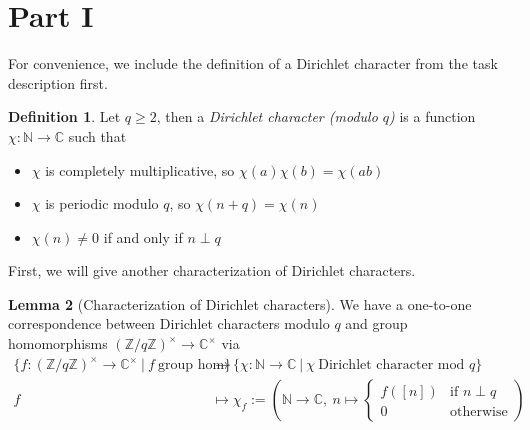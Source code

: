 \documentclass{scrartcl}
\newcommand{\N}{\mathbb{N}}
\newcommand{\Z}{\mathbb{Z}}
\newcommand{\C}{\mathbb{C}}
\newcommand{\units}{\times}
\theoremstyle{definition}
\newtheorem{definition}{Definition}
\newtheorem{lemma}[definition]{Lemma}
\begin{document}
\section{Part I}
For convenience, we include the definition of a Dirichlet character from the task description first.
\begin{definition}
    Let $q \geq 2$, then a \emph{Dirichlet character (modulo $q$)} is a function $\chi: \N \to \C$ such that
    \begin{itemize}
        \item $\chi$ is completely multiplicative, so $\chi(a)\chi(b) = \chi(ab)$
        \item $\chi$ is periodic modulo $q$, so $\chi(n + q) = \chi(n)$
        \item $\chi(n) \neq 0$ if and only if $n \perp q$
    \end{itemize}
\end{definition}
First, we will give another characterization of Dirichlet characters.
\begin{lemma}[Characterization of Dirichlet characters]
    \label{prop:characterization_dirichlet_character}
    We have a one-to-one correspondence between Dirichlet characters modulo $q$ and group homomorphisms $(\Z/q\Z)^\units \to \C^\units$ via
    \begin{align*}
        \{ f: (\Z/q\Z)^\units \to \C^\units \ | \ f \ \text{group hom} \} &\to \{ \chi: \N \to \C \ | \ \chi \ \text{Dirichlet character mod $q$} \} \\
        f &\mapsto \chi_f := \left( \N \to \C, \ n \mapsto \begin{cases}
            f([n]) & \text{if $n \perp q$} \\
            0 & \text{otherwise}
        \end{cases} \right)
    \end{align*}
\end{lemma}
\end{document}
